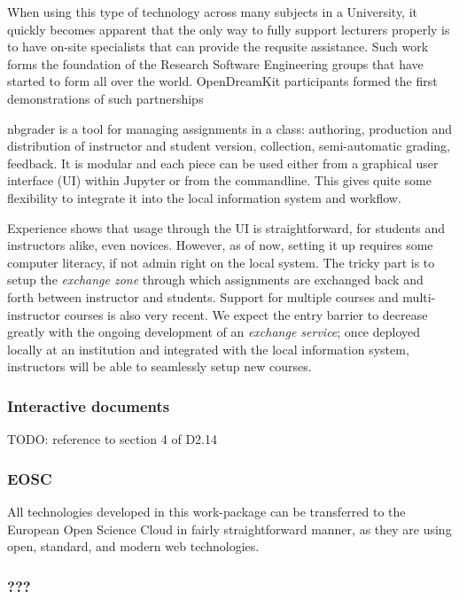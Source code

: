 \documentclass{deliverablereport}
\begin{document}
When using this type of technology across many subjects in a University,
it quickly becomes apparent that the only way to fully support lecturers
properly is to have on-site specialists that can provide the requsite
assistance. Such work forms the foundation of the Research Software
Engineering groups that have started to form all over the world.
OpenDreamKit participants formed the first demonstrations of such
partnerships

nbgrader is a tool for managing assignments in a class: authoring,
production and distribution of instructor and student version,
collection, semi-automatic grading, feedback. It is modular and each
piece can be used either from a graphical user interface (UI) within
Jupyter or from the commandline. This gives quite some flexibility to
integrate it into the local information system and workflow.

Experience shows that usage through the UI is straightforward, for
students and instructors alike, even novices. However, as of now,
setting it up requires some computer literacy, if not admin right on the
local system. The tricky part is to setup the \emph{exchange zone}
through which assignments are exchanged back and forth between
instructor and students. Support for multiple courses and
multi-instructor courses is also very recent. We expect the entry
barrier to decrease greatly with the ongoing development of an
\emph{exchange service}; once deployed locally at an institution and
integrated with the local information system, instructors will be able
to seamlessly setup new courses.

\subsubsection{Interactive documents}

TODO: reference to section 4 of D2.14

\subsubsection{EOSC}

All technologies developed in this work-package can be transferred to
the European Open Science Cloud in fairly straightforward manner, as
they are using open, standard, and modern web technologies.

\subsubsection{???}
\end{document}
